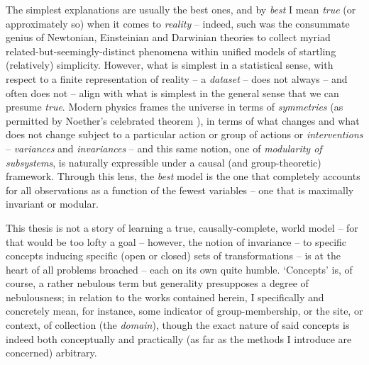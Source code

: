 The simplest explanations are usually the best ones, and by \emph{best} I mean \emph{true} (or
approximately so) when it comes to \emph{reality} -- indeed, such was the consummate genius of
Newtonian, Einsteinian and Darwinian theories to collect myriad related-but-seemingly-distinct
phenomena within unified models of startling (relatively) simplicity.
%
However, what is simplest in a statistical sense, with respect to a finite representation of
reality -- a \emph{dataset} -- does not always -- and often does not -- align with what is simplest
in the general sense that we can presume \emph{true}.
%
Modern physics frames the universe in terms of \emph{symmetries} (as permitted by Noether's
celebrated theorem \citep{noether1918invariante}), in terms of what changes and what does not
change subject to a particular action or group of actions or \emph{interventions} --
\emph{variances} and \emph{invariances} -- and this same notion, one of \emph{modularity of
subsystems}, is naturally expressible under a causal (and group-theoretic) framework.
%
Through this lens, the \emph{best} model is the one that completely accounts for all observations
as a function of the fewest variables -- one that is maximally invariant or modular.

%
This thesis is not a story of learning a true, causally-complete, world model -- for that would be
too lofty a goal -- however, the notion of invariance -- to specific concepts inducing specific
(open or closed) sets of transformations -- is at the heart of all problems broached -- each on
its own quite humble.
%
`Concepts' is, of course, a rather nebulous term but generality presupposes a degree of
nebulousness; in relation to the works contained herein, I specifically and concretely mean, for
instance, some indicator of group-membership, or the site, or context, of collection (the
\emph{domain}), though the exact nature of said concepts is indeed both conceptually and
practically (as far as the methods I introduce are concerned) arbitrary.
%

